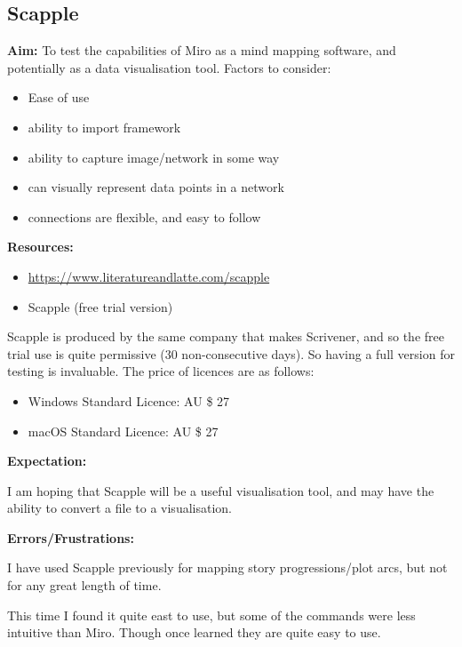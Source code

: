 \documentclass{article}
\begin{document}
\pagebreak

\subsection{Scapple}
\textbf{Aim:}
To test the capabilities of Miro as a mind mapping software, and potentially as a data visualisation tool. Factors to consider:

\begin{itemize}
    \item Ease of use
    \item ability to import framework
    \item ability to capture image/network in some way
    \item can visually represent data points in a network
    \item connections are flexible, and easy to follow
\end{itemize}


\textbf{Resources:}
\begin{itemize}
    \item \url{https://www.literatureandlatte.com/scapple}
    \item Scapple (free trial version)
\end{itemize}

Scapple is produced by the same company that makes Scrivener, and so the free trial use is quite permissive (30 non-consecutive days). So having a full version for testing is invaluable. 
The price of licences are as follows:
\begin{itemize}
    \item Windows Standard Licence: AU \$ 27
    \item macOS Standard Licence: AU \$ 27
\end{itemize}


\textbf{Expectation:}

I am hoping that Scapple will be a useful visualisation tool, and may have the ability to convert a file to a visualisation. 

\label{Error: Scrapple Errors/Frustrations}
\textbf{Errors/Frustrations:}

I have used Scapple previously for mapping story progressions/plot arcs, but not for any great length of time. 

This time I found it quite east to use, but some of the commands were less intuitive than Miro. Though once learned they are quite easy to use.
\end{document}
